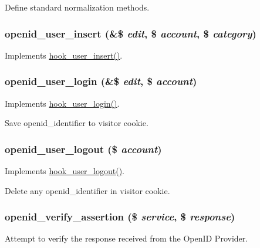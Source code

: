 Define standard normalization methods. \hypertarget{openid_8module_a11174384d46cea926dbe85c0fc64dcce}{
\subsubsection[{openid\_\-user\_\-insert}]{\setlength{\rightskip}{0pt plus 5cm}openid\_\-user\_\-insert (\&\$ {\em edit}, \/  \$ {\em account}, \/  \$ {\em category})}}
\label{openid_8module_a11174384d46cea926dbe85c0fc64dcce}
Implements \hyperlink{group__hooks_gaa3e2c4c972ee796d216b15da7aaf9c2c}{hook\_\-user\_\-insert()}. \hypertarget{openid_8module_aa0ecaf6826cbc73940e3e88ef18a2715}{
\subsubsection[{openid\_\-user\_\-login}]{\setlength{\rightskip}{0pt plus 5cm}openid\_\-user\_\-login (\&\$ {\em edit}, \/  \$ {\em account})}}
\label{openid_8module_aa0ecaf6826cbc73940e3e88ef18a2715}
Implements \hyperlink{group__hooks_ga8cce712a39ee6e57bd506b5a0c457d09}{hook\_\-user\_\-login()}.

Save openid\_\-identifier to visitor cookie. \hypertarget{openid_8module_a46b5934f9e70d9f51afb48d413db6ffe}{
\subsubsection[{openid\_\-user\_\-logout}]{\setlength{\rightskip}{0pt plus 5cm}openid\_\-user\_\-logout (\$ {\em account})}}
\label{openid_8module_a46b5934f9e70d9f51afb48d413db6ffe}
Implements \hyperlink{group__hooks_ga49a4bb63d4b643cf9e3feb2266fe4865}{hook\_\-user\_\-logout()}.

Delete any openid\_\-identifier in visitor cookie. \hypertarget{openid_8module_a8f328709b317b9c509b5572afa331469}{
\subsubsection[{openid\_\-verify\_\-assertion}]{\setlength{\rightskip}{0pt plus 5cm}openid\_\-verify\_\-assertion (\$ {\em service}, \/  \$ {\em response})}}
\label{openid_8module_a8f328709b317b9c509b5572afa331469}
Attempt to verify the response received from the OpenID Provider.



